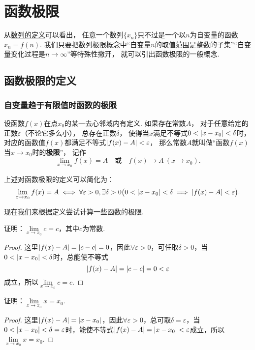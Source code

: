 \section{函数极限}
从\hyperref[definition.数列.数列的定义]{数列的定义}可以看出，%
任意一个数列\(\{x_n\}\)只不过是一个以\(n\)为自变量的函数\(x_n = f(n)\).
我们只要把数列极限概念中“自变量\(n\)的取值范围是整数的子集”“自变量变化过程是\(n\to\infty\)”等特殊性撇开，%
就可以引出函数极限的一般概念.

\subsection{函数极限的定义}
\subsubsection*{自变量趋于有限值时函数的极限}
\begin{definition}\label{definition:极限.函数极限的定义1}
设函数\(f(x)\)在点\(x_0\)的某一去心邻域内有定义.
如果存在常数\(A\)，%
对于任意给定的正数\(\varepsilon\)（不论它多么小），%
总存在正数\(\delta\)，%
使得当\(x\)满足不等式\(0 < \abs{x-x_0} < \delta\)时，%
对应的函数值\(f(x)\)都满足不等式\(\abs{f(x)-A}<\varepsilon\)，%
那么常数\(A\)就叫做“函数\(f(x)\)当\(x \to x_0\)时的\textbf{极限}”，%
记作
\[
\lim\limits_{x \to x_0} f(x) = A
\quad\text{或}\quad
f(x) \to A\ (x \to x_0).
\]
\end{definition}

上述对函数极限的定义可以简化为：
\[
\lim\limits_{x \to x_0}f(x) = A
\iff
\forall \varepsilon > 0,
\exists \delta > 0
\bigl( 0 < \abs{x - x_0} < \delta \implies \abs{f(x) - A} < \varepsilon \bigr).
\]

现在我们来根据定义尝试计算一些函数的极限.
\begin{example}
证明：\(\lim\limits_{x \to x_0} c = c\)，其中\(c\)为常数.
\begin{proof}
这里\(\abs{f(x) - A} = \abs{c - c} = 0\)，因此\(\forall \varepsilon > 0\)，可任取\(\delta > 0\)，当\(0 < \abs{x - x_0} < \delta\)时，总能使不等式\[
\abs{f(x) - A} = \abs{c - c} = 0 < \varepsilon
\]成立，所以\(\lim\limits_{x \to x_0} c = c\).
\end{proof}
\end{example}

\begin{example}
证明：\(\lim\limits_{x \to x_0} x = x_0\).
\begin{proof}
这里\(\abs{f(x) - A} = \abs{x - x_0}\)，因此\(\forall \varepsilon > 0\)，总可取\(\delta = \varepsilon\)，当\(0 < \abs{x - x_0} < \delta = \varepsilon\)时，能使不等式\(\abs{f(x) - A} = \abs{x - x_0} < \varepsilon\)成立，所以\(\lim\limits_{x \to x_0} x = x_0\).
\end{proof}
\end{example}

